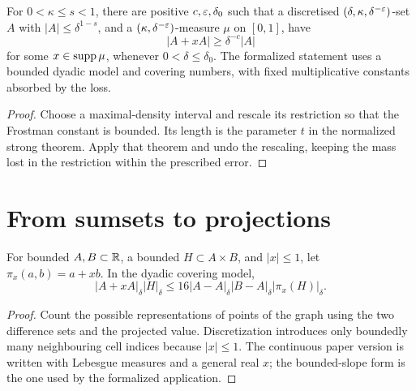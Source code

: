 \begin{theorem}
\label{thm:weak-ring}
For $0<\kappa\leq s<1$, there are positive $c,\varepsilon,\delta_0$
such that a discretised $(\delta,\kappa,\delta^{-\varepsilon})$-set $A$
with $|A|\leq\delta^{1-s}$, and a
$(\kappa,\delta^{-\varepsilon})$-measure $\mu$ on $[0,1]$, have
\[
                    |A+xA|\geq\delta^{-c}|A|
\]
for some $x\in\operatorname{supp}\mu$, whenever $0<\delta\leq\delta_0$.
The formalized statement uses a bounded dyadic model and covering
numbers, with fixed multiplicative constants absorbed by the loss.
\end{theorem}
\begin{proof}
Choose a maximal-density interval and rescale its restriction so
that the Frostman constant is bounded. Its length is the parameter
$t$ in the normalized strong theorem. Apply that theorem and undo
the rescaling, keeping the mass lost in the restriction within the
prescribed error.
\end{proof}

\section{From sumsets to projections}

\begin{lemma}
\label{lem:product-projection}
\leanok
For bounded $A,B\subset\mathbb{R}$, a bounded $H\subset A\times B$, and
$|x|\leq1$, let $\pi_x(a,b)=a+xb$. In the dyadic covering model,
\[
 |A+xA|_\delta|H|_\delta
       \leq16|A-A|_\delta|B-A|_\delta|\pi_x(H)|_\delta.
\]
\end{lemma}
\begin{proof}
\leanok
Count the possible representations of points of the graph using
the two difference sets and the projected value. Discretization
introduces only boundedly many neighbouring cell indices because
$|x|\leq1$. The continuous paper version is written with Lebesgue
measures and a general real $x$; the bounded-slope form is the one
used by the formalized application.
\end{proof}


